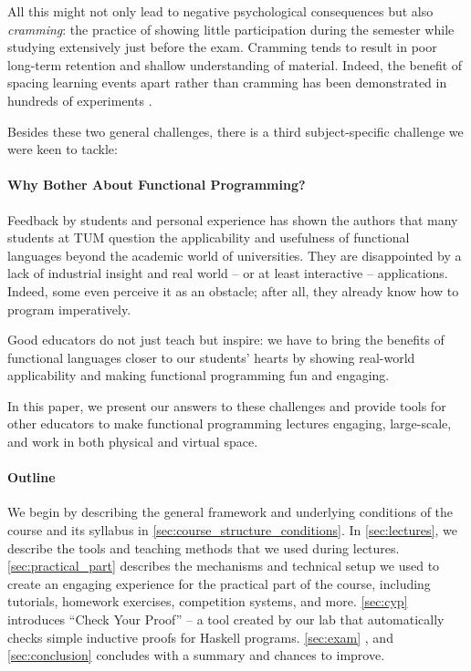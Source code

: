 All this might not only lead to negative psychological consequences but also \emph{cramming}:
the practice of showing little participation during the semester
while studying extensively just before the exam.
Cramming tends to result in poor long-term retention and shallow understanding of material.
Indeed, the benefit of spacing learning events apart rather than cramming has been demonstrated in hundreds of experiments \citep{cramming1,cramming2}.

\vspace{\baselineskip}\noindent
Besides these two general challenges,
there is a third subject-specific
challenge we were keen to tackle:

\paragraph{Why Bother About Functional Programming?}
Feedback by students and personal experience has shown the authors that many students
at TUM question the applicability and usefulness
of functional languages beyond
the academic world of universities.
They are disappointed by a lack of industrial insight
and real world -- or at least interactive -- applications.
Indeed, some even perceive it as an obstacle;
after all, they already know how to program imperatively.

Good educators do not just teach but inspire:
we have to bring the benefits of functional languages
closer to our students' hearts
by showing real-world applicability and making functional programming fun and engaging.


\vspace{\baselineskip}\noindent
In this paper,
we present our answers to these challenges
and provide tools for other educators
to make functional programming lectures engaging,
large-scale, and work in both physical and virtual space.

\paragraph{Outline}

We begin by describing the general framework and underlying conditions of the course and its syllabus in \cref{sec:course_structure_conditions}.
In \cref{sec:lectures},
we describe the tools and teaching methods that we used during lectures.
\cref{sec:practical_part} describes the
mechanisms and technical setup
we used to create an engaging experience
for the practical part of the course,
including tutorials, homework exercises,
competition systems, and more.
\cref{sec:cyp} introduces
``Check Your Proof'' -- a tool created
by our lab that automatically checks simple inductive proofs for Haskell programs.
\cref{sec:exam} ,
and \cref{sec:conclusion} concludes with a summary and chances to improve.

